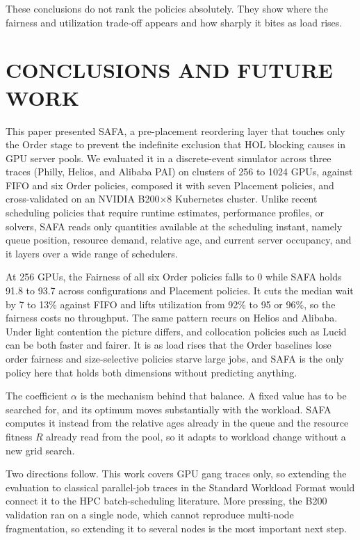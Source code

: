 \documentclass{ieeetj}
\begin{document}
These conclusions do not rank the policies absolutely. They show where the fairness and utilization trade-off appears and how sharply it bites as load rises.

\FloatBarrier

\section{CONCLUSIONS AND FUTURE WORK}\label{conclu}

This paper presented SAFA, a pre-placement reordering layer that touches only the Order stage to prevent the indefinite exclusion that HOL blocking causes in GPU server pools. We evaluated it in a discrete-event simulator across three traces (Philly, Helios, and Alibaba PAI) on clusters of 256 to 1024 GPUs, against FIFO and six Order policies, composed it with seven Placement policies, and cross-validated on an NVIDIA B200$\times$8 Kubernetes cluster. Unlike recent scheduling policies that require runtime estimates, performance profiles, or solvers, SAFA reads only quantities available at the scheduling instant, namely queue position, resource demand, relative age, and current server occupancy, and it layers over a wide range of schedulers.

At 256 GPUs, the Fairness of all six Order policies falls to 0 while SAFA holds 91.8 to 93.7 across configurations and Placement policies. It cuts the median wait by 7 to 13\% against FIFO and lifts utilization from 92\% to 95 or 96\%, so the fairness costs no throughput. The same pattern recurs on Helios and Alibaba. Under light contention the picture differs, and collocation policies such as Lucid can be both faster and fairer. It is as load rises that the Order baselines lose order fairness and size-selective policies starve large jobs, and SAFA is the only policy here that holds both dimensions without predicting anything.

The coefficient $\alpha$ is the mechanism behind that balance. A fixed value has to be searched for, and its optimum moves substantially with the workload. SAFA computes it instead from the relative ages already in the queue and the resource fitness $R$ already read from the pool, so it adapts to workload change without a new grid search.

Two directions follow. This work covers GPU gang traces only, so extending the evaluation to classical parallel-job traces in the Standard Workload Format would connect it to the HPC batch-scheduling literature. More pressing, the B200 validation ran on a single node, which cannot reproduce multi-node fragmentation, so extending it to several nodes is the most important next step.
\end{document}
